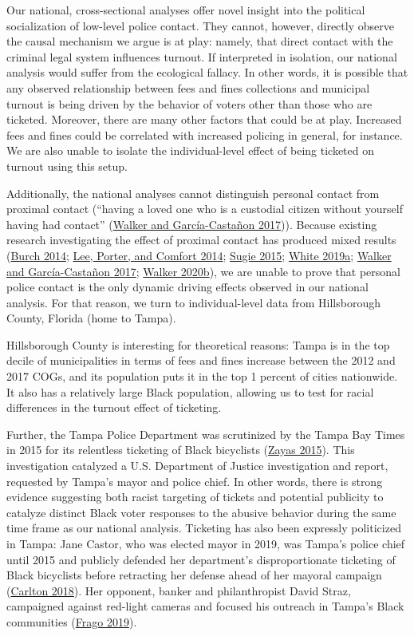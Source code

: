 \documentclass[
  12pt,
]{article}
\begin{document}
Our national, cross-sectional analyses offer novel insight into the political socialization of low-level police contact. They cannot, however, directly observe the causal mechanism we argue is at play: namely, that direct contact with the criminal legal system influences turnout. If interpreted in isolation, our national analysis would suffer from the ecological fallacy. In other words, it is possible that any observed relationship between fees and fines collections and municipal turnout is being driven by the behavior of voters other than those who are ticketed. Moreover, there are many other factors that could be at play. Increased fees and fines could be correlated with increased policing in general, for instance. We are also unable to isolate the individual-level effect of being ticketed on turnout using this setup.

Additionally, the national analyses cannot distinguish personal contact from proximal contact (``having a loved one who is a custodial citizen without yourself having had contact'' (\protect\hyperlink{ref-Walker2017}{Walker and García-Castañon 2017})). Because existing research investigating the effect of proximal contact has produced mixed results (\protect\hyperlink{ref-Burch2014}{Burch 2014}; \protect\hyperlink{ref-Lee2014}{Lee, Porter, and Comfort 2014}; \protect\hyperlink{ref-Sugie2015}{Sugie 2015}; \protect\hyperlink{ref-White2019}{White 2019a}; \protect\hyperlink{ref-Walker2017}{Walker and García-Castañon 2017}; \protect\hyperlink{ref-Walker2020}{Walker 2020b}), we are unable to prove that personal police contact is the only dynamic driving effects observed in our national analysis. For that reason, we turn to individual-level data from Hillsborough County, Florida (home to Tampa).

Hillsborough County is interesting for theoretical reasons: Tampa is in the top decile of municipalities in terms of fees and fines increase between the 2012 and 2017 COGs, and its population puts it in the top 1 percent of cities nationwide. It also has a relatively large Black population, allowing us to test for racial differences in the turnout effect of ticketing.

Further, the Tampa Police Department was scrutinized by the Tampa Bay Times in 2015 for its relentless ticketing of Black bicyclists (\protect\hyperlink{ref-Zayas2015}{Zayas 2015}). This investigation catalyzed a U.S. Department of Justice investigation and report, requested by Tampa's mayor and police chief. In other words, there is strong evidence suggesting both racist targeting of tickets and potential publicity to catalyze distinct Black voter responses to the abusive behavior during the same time frame as our national analysis. Ticketing has also been expressly politicized in Tampa: Jane Castor, who was elected mayor in 2019, was Tampa's police chief until 2015 and publicly defended her department's disproportionate ticketing of Black bicyclists before retracting her defense ahead of her mayoral campaign (\protect\hyperlink{ref-Carlton2018}{Carlton 2018}). Her opponent, banker and philanthropist David Straz, campaigned against red-light cameras and focused his outreach in Tampa's Black communities (\protect\hyperlink{ref-Frago2019}{Frago 2019}).
\end{document}
